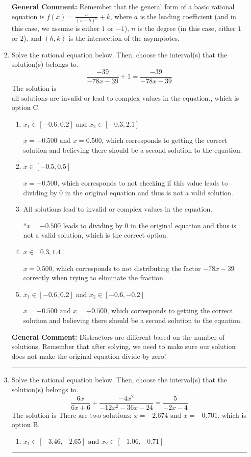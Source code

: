 \documentclass{extbook}[14pt]
\newcommand{\litem}[1]{\item #1

\rule{\textwidth}{0.4pt}}
\begin{document}
\begin{enumerate}
{\textbf{General Comment:} Remember that the general form of a basic rational equation is $ f(x) = \frac{a}{(x-h)^n} + k$, where $a$ is the leading coefficient (and in this case, we assume is either $1$ or $-1$), $n$ is the degree (in this case, either $1$ or $2$), and $(h, k)$ is the intersection of the asymptotes.
}
\litem{
Solve the rational equation below. Then, choose the interval(s) that the solution(s) belongs to.
\[ \frac{-39}{-78x -39} + 1 = \frac{-39}{-78x -39} \]The solution is \( \text{all solutions are invalid or lead to complex values in the equation.} \), which is option C.\begin{enumerate}[label=\Alph*.]
\item \( x_1 \in [-0.6, 0.2] \text{ and } x_2 \in [-0.3,2.1] \)

$x = -0.500 \text{ and } x = 0.500$, which corresponds to getting the correct solution and believing there should be a second solution to the equation.
\item \( x \in [-0.5,0.5] \)

$x = -0.500$, which corresponds to not checking if this value leads to dividing by 0 in the original equation and thus is not a valid solution.
\item \( \text{All solutions lead to invalid or complex values in the equation.} \)

*$x = -0.500$ leads to dividing by 0 in the original equation and thus is not a valid solution, which is the correct option.
\item \( x \in [0.3,1.4] \)

$x = 0.500$, which corresponds to not distributing the factor $-78x -39$ correctly when trying to eliminate the fraction.
\item \( x_1 \in [-0.6, 0.2] \text{ and } x_2 \in [-0.6,-0.2] \)

$x = -0.500 \text{ and } x = -0.500$, which corresponds to getting the correct solution and believing there should be a second solution to the equation.
\end{enumerate}

\textbf{General Comment:} Distractors are different based on the number of solutions. Remember that after solving, we need to make sure our solution does not make the original equation divide by zero!
}
\litem{
Solve the rational equation below. Then, choose the interval(s) that the solution(s) belongs to.
\[ \frac{6x}{6x + 6} + \frac{-4x^{2}}{-12x^{2} -36 x -24} = \frac{5}{-2x -4} \]The solution is \( \text{There are two solutions: } x = -2.674 \text{ and } x = -0.701 \), which is option B.\begin{enumerate}[label=\Alph*.]
\item \( x_1 \in [-3.46, -2.65] \text{ and } x_2 \in [-1.06,-0.71] \)



\end{enumerate}}
\end{enumerate}
\end{document}
